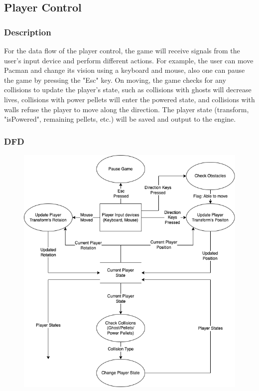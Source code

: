 \documentclass{article}
\begin{document}
\subsection{Player Control}
\subsubsection{Description}
\par For the data flow of the player control, the game will receive signals from the user's input device and perform different actions. For example, the user can move Pacman and change its vision using a keyboard and mouse, also one can pause the game by pressing the "Esc" key. On moving, the game checks for any collisions to update the player's state, such as collisions with ghosts will decrease lives, collisions with power pellets will enter the powered state, and collisions with walls refuse the player to move along the direction. The player state (transform, "isPowered", remaining pellets, etc.) will be saved and output to the engine.
\subsubsection{DFD}
\begin{figure}[H]
    \centering
    \includegraphics*[scale=0.4]{PlayerControl_DFD.png}
\end{figure}
\end{document}
